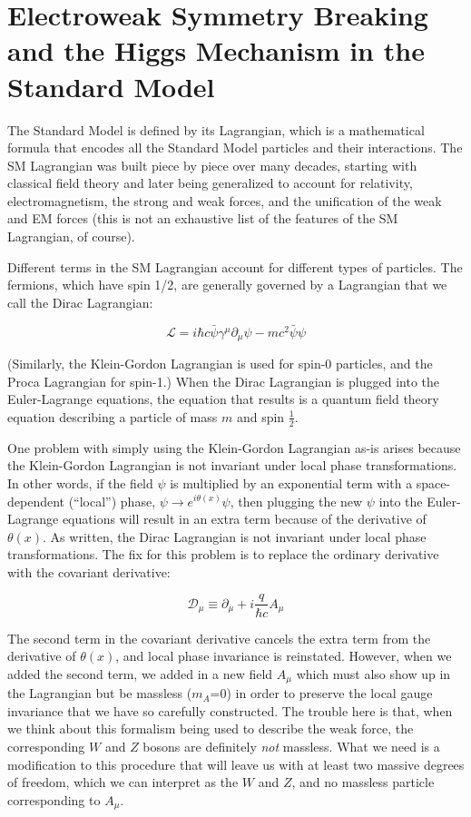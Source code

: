 \section{Electroweak Symmetry Breaking and the Higgs Mechanism in the Standard Model}
The Standard Model is defined by its Lagrangian, which is a mathematical formula that encodes all the Standard Model particles and their interactions.  The SM Lagrangian was built piece by piece over many decades, starting with classical field theory and later being generalized to account for relativity, electromagnetism, the strong and weak forces, and the unification of the weak and EM forces (this is not an exhaustive list of the features of the SM Lagrangian, of course).  

Different terms in the SM Lagrangian account for different types of particles.  The fermions, which have spin 1/2, are generally governed by a Lagrangian that we call the Dirac Lagrangian:

\begin{equation}
\mathscr{L}= i\hbar c \bar{\psi} \gamma^\mu \partial_\mu \psi -mc^2 \bar{\psi}\psi
\end{equation}

(Similarly, the Klein-Gordon Lagrangian is used for spin-0 particles, and the Proca Lagrangian for spin-1.)  When the Dirac Lagrangian is plugged into the Euler-Lagrange equations, the equation that results is a quantum field theory equation describing a particle of mass $m$ and spin $\frac{1}{2}$.  

One problem with simply using the Klein-Gordon Lagrangian as-is arises because the Klein-Gordon Lagrangian is not invariant under local phase transformations.  In other words, if the field $\psi$ is multiplied by an exponential term with a space-dependent (``local'') phase, $\psi \rightarrow e^{i\theta(x)} \psi$, then plugging the new $\psi$ into the Euler-Lagrange equations will result in an extra term because of the derivative of $\theta(x)$.  As written, the Dirac Lagrangian is not invariant under local phase transformations.  The fix for this problem is to replace the ordinary derivative with the covariant derivative:

\begin{equation}
\mathscr{D}_\mu \equiv \partial_\mu + i\frac{q}{\hbar c}A_\mu
\end{equation}

The second term in the covariant derivative cancels the extra term from the derivative of $\theta(x)$, and local phase invariance is reinstated.  However, when we added the second term, we added in a new field $A_\mu$ which must also show up in the Lagrangian but be massless ($m_A$=0) in order to preserve the local gauge invariance that we have so carefully constructed.  The trouble here is that, when we think about this formalism being used to describe the weak force, the corresponding $W$ and $Z$ bosons are definitely \textit{not} massless.  What we need is a modification to this procedure that will leave us with at least two massive degrees of freedom, which we can interpret as the $W$ and $Z$, and no massless particle corresponding to $A_\mu$.

